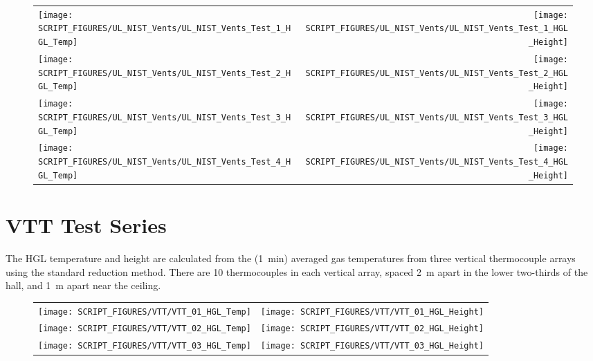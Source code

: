 \newpage

\begin{figure}[p]
\begin{tabular*}{\textwidth}{l@{\extracolsep{\fill}}r}
\texttt{[image: SCRIPT\_FIGURES/UL\_NIST\_Vents/UL\_NIST\_Vents\_Test\_1\_HGL\_Temp]} &
\texttt{[image: SCRIPT\_FIGURES/UL\_NIST\_Vents/UL\_NIST\_Vents\_Test\_1\_HGL\_Height]} \\
\texttt{[image: SCRIPT\_FIGURES/UL\_NIST\_Vents/UL\_NIST\_Vents\_Test\_2\_HGL\_Temp]} &
\texttt{[image: SCRIPT\_FIGURES/UL\_NIST\_Vents/UL\_NIST\_Vents\_Test\_2\_HGL\_Height]} \\
\texttt{[image: SCRIPT\_FIGURES/UL\_NIST\_Vents/UL\_NIST\_Vents\_Test\_3\_HGL\_Temp]} &
\texttt{[image: SCRIPT\_FIGURES/UL\_NIST\_Vents/UL\_NIST\_Vents\_Test\_3\_HGL\_Height]} \\
\texttt{[image: SCRIPT\_FIGURES/UL\_NIST\_Vents/UL\_NIST\_Vents\_Test\_4\_HGL\_Temp]} &
\texttt{[image: SCRIPT\_FIGURES/UL\_NIST\_Vents/UL\_NIST\_Vents\_Test\_4\_HGL\_Height]}
\end{tabular*}
\end{figure}

\clearpage

\section{VTT Test Series}

The HGL temperature and height are calculated from the (1~min) averaged gas temperatures from three vertical thermocouple arrays using the standard reduction method. There are 10 thermocouples in each vertical array, spaced 2~m apart in the lower two-thirds of the hall, and 1~m apart near the ceiling.

\begin{figure}[h!]
\begin{tabular*}{\textwidth}{l@{\extracolsep{\fill}}r}
\texttt{[image: SCRIPT\_FIGURES/VTT/VTT\_01\_HGL\_Temp]} &
\texttt{[image: SCRIPT\_FIGURES/VTT/VTT\_01\_HGL\_Height]} \\
\texttt{[image: SCRIPT\_FIGURES/VTT/VTT\_02\_HGL\_Temp]} &
\texttt{[image: SCRIPT\_FIGURES/VTT/VTT\_02\_HGL\_Height]} \\
\texttt{[image: SCRIPT\_FIGURES/VTT/VTT\_03\_HGL\_Temp]} &
\texttt{[image: SCRIPT\_FIGURES/VTT/VTT\_03\_HGL\_Height]}
\end{tabular*}
\end{figure}



